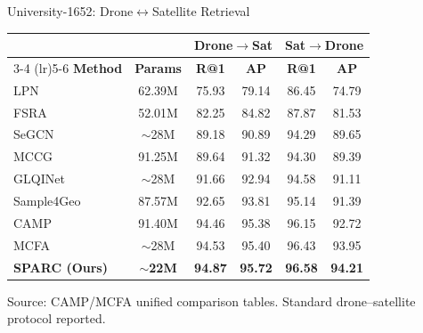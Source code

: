 \documentclass[aspectratio=169, 11pt]{beamer}
\begin{document}
\begin{frame}{University-1652: Drone$\leftrightarrow$Satellite Retrieval}
\footnotesize
\centering
\begin{tabular}{@{}l c c c c c@{}}
  \toprule
  & & \multicolumn{2}{c}{\textbf{Drone$\to$Sat}} & \multicolumn{2}{c}{\textbf{Sat$\to$Drone}} \\
  \cmidrule(lr){3-4} \cmidrule(lr){5-6}
  \textbf{Method} & \textbf{Params} & \textbf{R@1} & \textbf{AP} & \textbf{R@1} & \textbf{AP} \\
  \midrule
  LPN & 62.39M & 75.93 & 79.14 & 86.45 & 74.79 \\
  FSRA & 52.01M & 82.25 & 84.82 & 87.87 & 81.53 \\
  SeGCN & $\sim$28M & 89.18 & 90.89 & 94.29 & 89.65 \\
  MCCG & 91.25M & 89.64 & 91.32 & 94.30 & 89.39 \\
  GLQINet & $\sim$28M & 91.66 & 92.94 & 94.58 & 91.11 \\
  Sample4Geo & 87.57M & 92.65 & 93.81 & 95.14 & 91.39 \\
  CAMP & 91.40M & 94.46 & 95.38 & 96.15 & 92.72 \\
  MCFA & $\sim$28M & 94.53 & 95.40 & 96.43 & 93.95 \\
  \midrule
  \rowcolor{successgreen!20}
  \textbf{SPARC (Ours)} & \textbf{$\sim$22M} & \textbf{94.87} & \textbf{95.72} & \textbf{96.58} & \textbf{94.21} \\
  \bottomrule
\end{tabular}

\vspace{0.1cm}
{\tiny Source: CAMP/MCFA unified comparison tables. Standard drone--satellite protocol reported.}

\vspace{0.2cm}
\end{frame}
\end{document}
